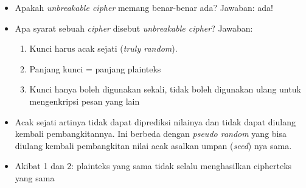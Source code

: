 \documentclass{article}
\begin{document}

\begin{itemize}
    \item Apakah \textit{unbreakable cipher} memang benar-benar ada?
    Jawaban: ada!
    \item Apa syarat sebuah \textit{cipher} disebut \textit{unbreakable cipher}?
    Jawaban:
    \begin{enumerate}
        \item Kunci harus acak sejati (\textit{truly random}).
        \item Panjang kunci = panjang plainteks
        \item Kunci hanya boleh digunakan sekali, tidak boleh digunakan ulang untuk mengenkripsi pesan yang lain
    \end{enumerate}
    \item Acak sejati artinya tidak dapat diprediksi nilainya dan tidak dapat diulang kembali pembangkitannya. Ini berbeda dengan \textit{pseudo random} yang bisa diulang kembali pembangkitan nilai acak asalkan umpan (\textit{seed}) nya sama.
    \item Akibat 1 dan 2: plainteks yang sama tidak selalu menghasilkan cipherteks yang sama
\end{itemize}
\end{document}
